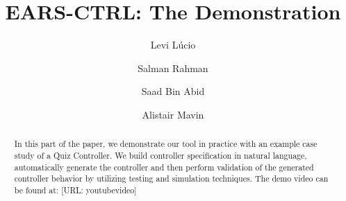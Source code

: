 \documentclass{llncs}
\begin{document}
%
\frontmatter          %

\mainmatter              %
%
\title{EARS-CTRL: The Demonstration}
%
\titlerunning{}  %
%
\author{Levi L\'ucio \and Salman Rahman
 \and Saad Bin Abid \and Alistair Mavin}
%
\authorrunning{} %
%
\tocauthor{}
%

\maketitle              %
\vspace{-.5cm}
\begin{abstract}
In this part of the paper, we demonstrate our tool in practice with an example
case study of a Quiz Controller. We build controller specification in natural
language, automatically generate the controller and then perform validation of
the generated controller behavior by utilizing testing and simulation
techniques. The demo video can be found at: [URL: youtubevideo]
\end{abstract}

 



\end{document}
